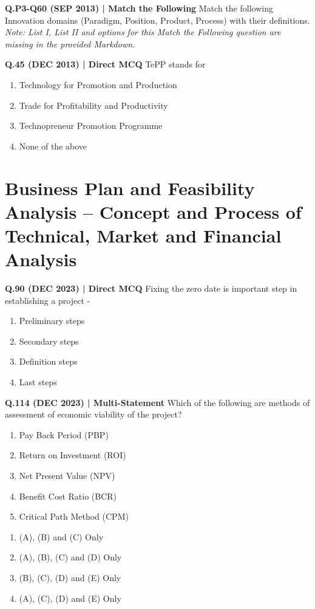 \documentclass{article}
\begin{document}
\textbf{Q.P3-Q60 (SEP 2013) | Match the Following}
Match the following Innovation domains (Paradigm, Position, Product, Process) with their definitions.
\emph{Note: List I, List II and options for this Match the Following question are missing in the provided Markdown.}

\textbf{Q.45 (DEC 2013) | Direct MCQ}
TePP stands for
\begin{enumerate}[label=(\arabic*)]
    \item Technology for Promotion and Production
    \item Trade for Profitability and Productivity
    \item Technopreneur Promotion Programme
    \item None of the above
\end{enumerate}

\section{Business Plan and Feasibility Analysis – Concept and Process of Technical, Market and Financial Analysis}

\textbf{Q.90 (DEC 2023) | Direct MCQ}
Fixing the zero date is important step in establishing a project -
\begin{enumerate}[label=(\arabic*)]
    \item Preliminary steps
    \item Secondary steps
    \item Definition steps
    \item Last steps
\end{enumerate}

\textbf{Q.114 (DEC 2023) | Multi-Statement}
Which of the following are methods of assessment of economic viability of the project?
\begin{enumerate}[label=\Alph*.]
    \item Pay Back Period (PBP)
    \item Return on Investment (ROI)
    \item Net Present Value (NPV)
    \item Benefit Cost Ratio (BCR)
    \item Critical Path Method (CPM)
\end{enumerate}
\begin{enumerate}[label=(\arabic*)]
    \item (A), (B) and (C) Only
    \item (A), (B), (C) and (D) Only
    \item (B), (C), (D) and (E) Only
    \item (A), (C), (D) and (E) Only
\end{enumerate}
\end{document}
